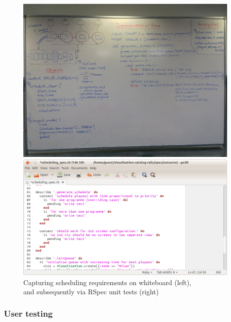 \documentclass[a4paper, titlepage]{article}
\begin{document}
\begin{figure}[h!]
  \begin{minipage}{0.46\textwidth}
      \includegraphics[width = 0.99\textwidth, trim = 0 1cm 0 1.5cm, clip]{./eval/scheduling_whiteboard.jpg}
  \end{minipage}
  \begin{minipage}{0.53\textwidth}
      \includegraphics[width = 0.99\textwidth]{./eval/scheduling_spec.png}
  \end{minipage}
  \caption{Capturing scheduling requirements on whiteboard (left), \\ and subsequently via RSpec unit tests (right)}
  \label{fig:eval_scheduling}
\end{figure}

\subsubsection{User testing}
\end{document}
